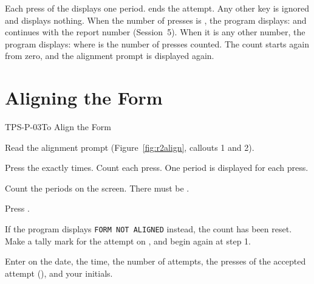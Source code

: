 
Each press of the  displays one period.   ends the
attempt.  Any other key is ignored and displays nothing.  When the number of
presses is , the program displays:
and continues with the report number (Session~5).  When it is any other
number, the program displays:
where  is the number of presses counted.  The count starts again from
zero, and the alignment prompt is displayed again.

\section{Aligning the Form}
\begin{Procedure}{TPS-P-03}{To Align the Form}
\begin{ProcSteps}
\item Read the alignment prompt (Figure~\ref{fig:r2align}, callouts 1 and
  2).
\item Press the  exactly  times.  Count
  each press.  One period is displayed for each press.
\item Count the periods on the screen.  There must be
  .
\item Press .
\item If the program displays \texttt{FORM NOT ALIGNED} instead, the count has
  been reset.  Make a tally mark for the attempt on , and begin
  again at step 1.
\item Enter on  the date, the time, the number of attempts, the
  presses of the accepted attempt (), and your
  initials.
\end{ProcSteps}
\end{Procedure}

